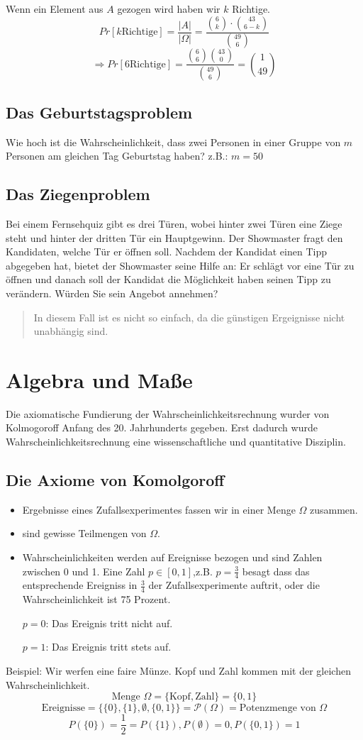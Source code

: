 Wenn ein Element aus $A$ gezogen wird haben wir $k$ Richtige.%
$$ Pr[k \textrm{Richtige}]=\frac{\left| A \right|}{\left| \Omega \right|} = \frac{\binom{6}{k} \cdot \binom{43}{6-k}}{\binom{49}{6}}$$
$$\Rightarrow Pr[6 \textrm{Richtige}]= \frac{\binom{6}{6} \binom{43}{0}}{\binom{49}{6}}=\binom{1}{49}$$
\subsection{Das Geburtstagsproblem}
Wie hoch ist die Wahrscheinlichkeit, dass zwei Personen in einer Gruppe von $m$ Personen am gleichen Tag Geburtstag haben?
z.B.: $m=50$
\subsection{Das Ziegenproblem}
Bei einem Fernsehquiz gibt es drei Türen, wobei hinter zwei Türen eine Ziege steht und hinter der dritten Tür ein Hauptgewinn. %
Der Showmaster fragt den Kandidaten, welche Tür er öffnen soll. Nachdem der Kandidat einen Tipp abgegeben hat, bietet der Showmaster seine Hilfe an: %
Er schlägt vor eine Tür zu öffnen und danach soll der Kandidat die Möglichkeit haben seinen Tipp zu verändern.%
Würden Sie sein Angebot annehmen?
\begin{quote}
 In diesem Fall ist es nicht so einfach, da die günstigen Ergeignisse nicht unabhängig sind.
\end{quote}
\section{Algebra und Maße}
Die axiomatische Fundierung der Wahrscheinlichkeitsrechnung wurder von Kolmogoroff Anfang des 20. Jahrhunderts gegeben. Erst dadurch wurde Wahrscheinlichkeitsrechnung eine wissenschaftliche und quantitative Disziplin.
\subsection{Die Axiome von Komolgoroff}
\begin{itemize}
 \item Ergebnisse eines Zufallsexperimentes fassen wir in einer Menge $\Omega$ zusammen.
 \item {} sind gewisse Teilmengen von $\Omega$.
 \item Wahrscheinlichkeiten werden auf Ereignisse bezogen und sind Zahlen zwischen 0 und 1. Eine Zahl $p \in [0,1]$,z.B. $p=\frac{3}{4}$ besagt dass das entsprechende Ereigniss in $\frac{3}{4}$ der Zufallsexperimente auftrit, oder die Wahrscheinlichkeit ist 75 Prozent.

$p=0$: Das Ereignis tritt nicht auf.

$p=1$: Das Ereignis tritt stets auf.
\end{itemize}
Beispiel: Wir werfen eine faire Münze. Kopf und Zahl kommen mit der gleichen Wahrscheinlichkeit.
$$ \textrm{Menge } \Omega = \{\textrm{Kopf},\textrm{Zahl}\} = \{0,1\} $$
$$ \textrm{Ereignisse} = \{\{0\},\{1\},\emptyset,\{0,1\}\} = \mathcal P(\Omega) = \textrm{Potenzmenge von } \Omega $$
$$ P(\{0\})=\frac{1}{2}=P(\{1\}), P(\emptyset)=0 , P(\{0,1\})=1$$
